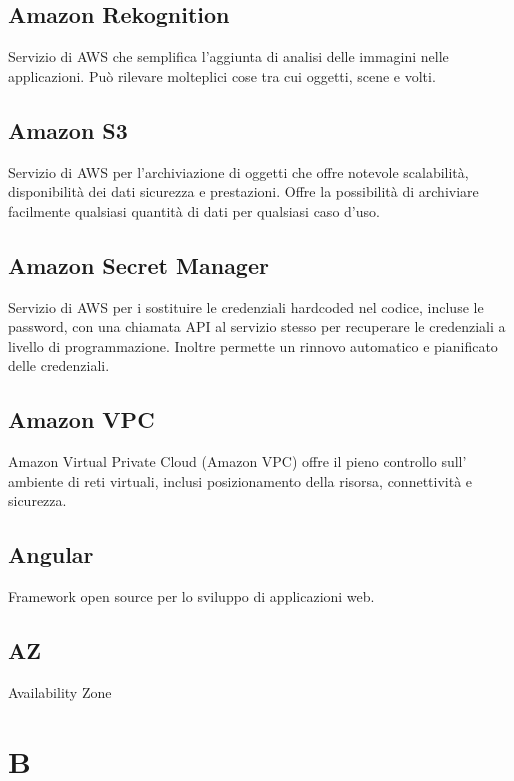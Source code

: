 \documentclass{classes/base}
\begin{document}
        \subsection*{Amazon Rekognition}
        Servizio di AWS che semplifica l'aggiunta di analisi delle immagini nelle applicazioni. Può rilevare molteplici cose tra cui oggetti, scene e volti.

        \subsection*{Amazon S3}
        \label{sec:S3}
        Servizio di AWS per l'archiviazione di oggetti che offre notevole scalabilità, disponibilità dei dati sicurezza e prestazioni. Offre la possibilità di archiviare facilmente qualsiasi quantità di dati per qualsiasi caso d'uso.
        
        \subsection*{Amazon Secret Manager}
        Servizio di AWS per i sostituire le credenziali hardcoded nel codice, incluse le password, con una chiamata API al servizio stesso per recuperare le credenziali a livello di programmazione. Inoltre permette un rinnovo automatico e pianificato delle credenziali.

        \subsection*{Amazon VPC}
        Amazon Virtual Private Cloud (Amazon VPC) offre il pieno controllo sull' ambiente di reti virtuali, inclusi posizionamento della risorsa, connettività e sicurezza.

        \subsection*{Angular} 
        Framework open source per lo sviluppo di applicazioni web.

        \subsection*{AZ}
        Availability Zone
    
        \newpage  
    \section{B}
    
\end{document}
